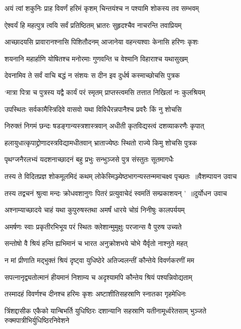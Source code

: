 \twolineshloka
{अयं त्वां शकुनिः प्राह विवर्णं हरिमं कृशम्}
{चिन्तयंश्च न पश्यामि शोकस्य तव सम्भवम्}


\twolineshloka
{ऐश्वर्यं हि महत्पुत्र त्वयि सर्वं प्रतिष्ठितम्}
{भ्रातरः सुहृदश्चैव नाचरन्ति तवाप्रियम्}


\twolineshloka
{आच्छादयसि प्रावारानश्नासि पिशितौदनम्}
{आजानेया वहन्त्यश्वाः केनासि हरिणः कृशः}


\twolineshloka
{शयनानि महार्हाणि योषितश्च मनोरमाः}
{गुणवन्ति च वेश्मानि विहाराश्च यथासुखम्}


\twolineshloka
{देवनामिव ते सर्वं वाचि बद्धं न संशयः}
{स दीन इव दुर्धर्ष कस्माच्छोचसि पुत्रक}


\twolineshloka
{`मात्रा पित्रा च पुत्रस्य यद्वै कार्यं परं स्मृतम्}
{प्राप्तस्त्वमसि तत्तात निखिलां नः कुलश्रियम्}


\twolineshloka
{उपस्थितः सर्वकामैस्त्रिदिवे वासवो यथा}
{विविधैरन्नपानैश्च प्रवरैः किं नु शोचसि}


\twolineshloka
{निरुक्तं निगमं छन्दः षडङ्गान्यस्त्रशास्त्रवान्}
{अधीती कृतविद्यस्त्वं दशव्याकरणैः कृपात्}


\twolineshloka
{हलायुधात्कृपाद्द्रोणादस्त्रविद्यामधीतवान्}
{भ्राताज्येष्ठः स्थितो राज्ये किमु शोचसि पुत्रक}


\twolineshloka
{पृथग्जनैरलभ्यं यदशनाच्छादनं बहु}
{प्रभुः सन्भुञ्जसे पुत्र संस्तुतः सूतमागधैः}


\twolineshloka
{तस्य ते विदितप्रज्ञ शोकमूलमिदं कथम्}
{लोकेस्मिञ्ज्येष्ठभागन्यस्तन्ममाचक्ष्व पृच्छतः ॥वैशम्पायन उवाच}


\twolineshloka
{तस्य तद्वचनं श्रुत्वा मन्दः क्रोधवशानुगः}
{पितरं प्रत्युवाचेदं स्वमतिं सम्प्रकाशयन् ' ॥दुर्योधन उवाच}


\twolineshloka
{अश्नाम्याच्छादये चाहं यथा कुपुरुषस्तथा}
{अमर्षं धारये चोग्रं निनीषुः कालपर्ययम्}


\twolineshloka
{अमर्षणः स्वाः प्रकृतीरभिभूय परं स्थितः}
{क्लेशान्मुमुक्षुः परजान्स वै पुरुष उच्यते}


\twolineshloka
{सन्तोषो वै श्रियं हन्ति ह्यभिमानं च भारत}
{अनुक्रोशभये चोभे यैर्वृतो नाश्नुते महत्}


\twolineshloka
{न मां प्रीणाति मद्भुक्तं श्रियं दृष्ट्वा युधिष्ठेरे}
{अतिज्वलन्तीं कौन्तेये विवर्णकरणीं मम}


\twolineshloka
{सपत्नानृद्व्यतोत्मानं हीयमानं निशाम्य च}
{अदृश्यामपि कौन्तेय श्रियं पश्यन्निवोद्यताम्}


\twolineshloka
{तस्मादहं विवर्णश्च दीनश्च हरिमः कृशः}
{अष्टाशीतिसहस्राणि स्नातका गृहमेधिनः}


\threelineshloka
{त्रिंशद्दासीक एकैको यान्बिभर्ति युधिष्ठिरः}
{दशान्यानि सहस्राणि यतीनामूर्ध्वरेतसाम्}
{भुञ्जते रुक्मपात्रीभिर्युधिष्ठिरनिवेशने}


